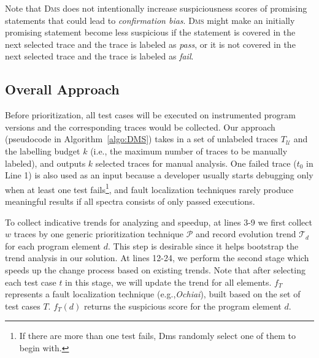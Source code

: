 Note that \textsc{Dms} does not intentionally increase suspiciousness scores of promising statements that could lead to {\em confirmation bias}. 
\textsc{Dms} might make an initially promising statement become less suspicious if the statement is covered in the next selected trace and the trace is labeled as {\em pass}, or it is not covered in the next selected trace and the trace is labeled as {\em fail}.

\subsection{Overall Approach}

Before prioritization, all test cases will be executed on instrumented program versions and the corresponding traces would be collected.
Our approach (pseudocode in Algorithm~\ref{algo:DMS}) takes in a set of unlabeled traces $T_\mathcal{U}$ and the labelling budget $k$ (i.e., the maximum number of traces to be manually labeled), and outputs $k$ selected traces for manual analysis.
One failed trace ($t_{0}$ in Line 1) is also used as an input because a developer usually starts debugging only when at least one test fails\footnote{If there are more than one test fails, Dms randomly select one of them to begin with.}, and fault localization techniques rarely produce meaningful results if all spectra consists of only passed executions.

To collect indicative trends for analyzing and speedup, at lines 3-9 we first collect $w$ traces by one generic prioritization technique $\mathcal{P}$ and record evolution trend $\mathcal{T}_{d}$ for each program element $d$. This step is desirable since it helps bootstrap the trend analysis in our solution.
At lines 12-24, we perform the second stage which speeds up the change process based on existing trends. Note that after selecting each test case $t$ in this stage, we will update the trend for all elements. $f_{T}$ represents a fault localization technique (e.g.,{\em Ochiai}), built based on the set of test cases $T$. $f_{T}(d)$ returns the suspicious score for the program element $d$.


